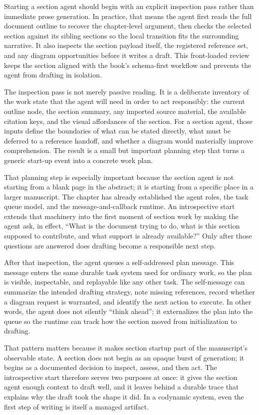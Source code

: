 Starting a section agent should begin with an explicit inspection pass rather than immediate prose generation. In practice, that means the agent first reads the full document outline to recover the chapter-level argument, then checks the selected section against its sibling sections so the local transition fits the surrounding narrative. It also inspects the section payload itself, the registered reference set, and any diagram opportunities before it writes a draft. This front-loaded review keeps the section aligned with the book's schema-first workflow and prevents the agent from drafting in isolation.

The inspection pass is not merely passive reading. It is a deliberate inventory of the work state that the agent will need in order to act responsibly: the current outline node, the section summary, any imported source material, the available citation keys, and the visual affordances of the section. For a section agent, those inputs define the boundaries of what can be stated directly, what must be deferred to a reference handoff, and whether a diagram would materially improve comprehension. The result is a small but important planning step that turns a generic start-up event into a concrete work plan.

That planning step is especially important because the section agent is not starting from a blank page in the abstract; it is starting from a specific place in a larger manuscript. The chapter has already established the agent roles, the task queue model, and the message-and-callback runtime. An introspective start extends that machinery into the first moment of section work by making the agent ask, in effect, ``What is the document trying to do, what is this section supposed to contribute, and what support is already available?'' Only after those questions are answered does drafting become a responsible next step.

After that inspection, the agent queues a self-addressed plan message. This message enters the same durable task system used for ordinary work, so the plan is visible, inspectable, and replayable like any other task. The self-message can summarize the intended drafting strategy, note missing references, record whether a diagram request is warranted, and identify the next action to execute. In other words, the agent does not silently ``think ahead''; it externalizes the plan into the queue so the runtime can track how the section moved from initialization to drafting.

That pattern matters because it makes section startup part of the manuscript's observable state. A section does not begin as an opaque burst of generation; it begins as a documented decision to inspect, assess, and then act. The introspective start therefore serves two purposes at once: it gives the section agent enough context to draft well, and it leaves behind a durable trace that explains why the draft took the shape it did. In a codynamic system, even the first step of writing is itself a managed artifact.

